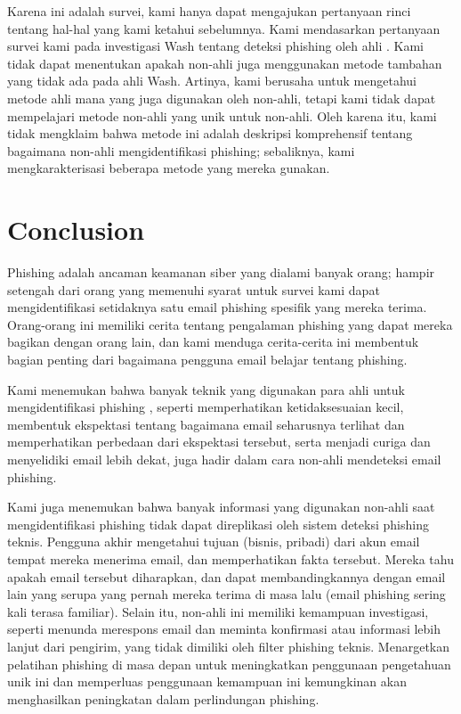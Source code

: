 \documentclass[lettersize,journal]{IEEEtran}
\begin{document}
Karena ini adalah survei, kami hanya dapat mengajukan pertanyaan rinci tentang
hal-hal yang kami ketahui sebelumnya. Kami mendasarkan pertanyaan survei kami
pada investigasi Wash tentang deteksi phishing oleh ahli \cite{tigaempat}. Kami
tidak dapat menentukan apakah non-ahli juga menggunakan metode tambahan yang
tidak ada pada ahli Wash. Artinya, kami berusaha untuk mengetahui metode ahli
mana yang juga digunakan oleh non-ahli, tetapi kami tidak dapat mempelajari
metode non-ahli yang unik untuk non-ahli. Oleh karena itu, kami tidak mengklaim
bahwa metode ini adalah deskripsi komprehensif tentang bagaimana non-ahli
mengidentifikasi phishing; sebaliknya, kami mengkarakterisasi beberapa metode
yang mereka gunakan.

\section{Conclusion}
Phishing adalah ancaman keamanan siber yang dialami banyak orang; hampir
setengah dari orang yang memenuhi syarat untuk survei kami dapat
mengidentifikasi setidaknya satu email phishing spesifik yang mereka terima.
Orang-orang ini memiliki cerita tentang pengalaman phishing yang dapat mereka
bagikan dengan orang lain, dan kami menduga cerita-cerita ini membentuk bagian
penting dari bagaimana pengguna email belajar tentang phishing.

Kami menemukan bahwa banyak teknik yang digunakan para ahli untuk
mengidentifikasi phishing \cite{tigaempat}, seperti memperhatikan
ketidaksesuaian kecil, membentuk ekspektasi tentang bagaimana email seharusnya
terlihat dan memperhatikan perbedaan dari ekspektasi tersebut, serta menjadi
curiga dan menyelidiki email lebih dekat, juga hadir dalam cara non-ahli
mendeteksi email phishing.

Kami juga menemukan bahwa banyak informasi yang digunakan non-ahli saat
mengidentifikasi phishing tidak dapat direplikasi oleh sistem deteksi phishing
teknis. Pengguna akhir mengetahui tujuan (bisnis, pribadi) dari akun email
tempat mereka menerima email, dan memperhatikan fakta tersebut. Mereka tahu
apakah email tersebut diharapkan, dan dapat membandingkannya dengan email lain
yang serupa yang pernah mereka terima di masa lalu (email phishing sering kali
terasa familiar). Selain itu, non-ahli ini memiliki kemampuan investigasi,
seperti menunda merespons email dan meminta konfirmasi atau informasi lebih
lanjut dari pengirim, yang tidak dimiliki oleh filter phishing teknis.
Menargetkan pelatihan phishing di masa depan untuk meningkatkan penggunaan
pengetahuan unik ini dan memperluas penggunaan kemampuan ini kemungkinan akan
menghasilkan peningkatan dalam perlindungan phishing.
\end{document}
